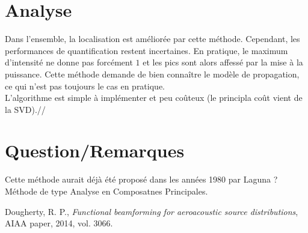 \documentclass[12pt]{article}
\begin{document}
 
\section{Analyse}
Dans l'ensemble, la localisation est améliorée par cette méthode. Cependant, les performances de quantification restent incertaines. En pratique, le maximum d'intensité ne donne pas forcément $1$ et les pics sont alors affessé par la mise à la puissance. Cette méthode demande de bien connaître le modèle de propagation, ce qui n'est pas toujours le cas en pratique.\\

L'algorithme est simple à implémenter et peu coûteux (le principla coût vient de la SVD).//

\section{Question/Remarques}
Cette méthode aurait déjà été proposé dans les années 1980 par Laguna ?\\
Méthode de type Analyse en Composatnes Principales. 
 
\medskip


\begin{thebibliography}{9}
 {Dougherty, R. P.},
\textit {Functional beamforming for aeroacoustic source distributions},
 {AIAA paper},
 {2014},
 {vol. 3066}.
\end{thebibliography}
\end{document}
